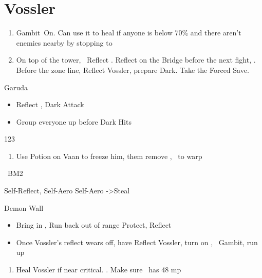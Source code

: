\chapter{Vossler}

\begin{enumerate}
\item Gambit\ashe\ On. Can use it to heal if anyone is below 70\% and there aren't enemies nearby by stopping to \flee
\item On top of the tower, \vaan\ Reflect \vaan. Reflect on the Bridge before the next fight, \leader{\penelo}. Before the zone line, Reflect Vossler, prepare Dark. Take the Forced Save.
\end{enumerate}
\begin{battle}{Garuda}
\begin{itemize}
\item Reflect \penelo, \ashe
\penelof Dark \ashe
\ashef Attack \penelo
\item Group everyone up before Dark Hits
\end{itemize}
\end{battle}
\begin{shop}{123}
\end{shop}
\begin{enumerate}
\item Use Potion on Vaan to freeze him, them remove \ashe, \penelo\ to warp
\end{enumerate}
\begin{liscense}
\ashe\ BM2
\end{liscense}
\begin{gambit}
\begin{itemize}
\penelof Self-Reflect, Self-Aero
\ashef Self-Aero
->Steal
\end{itemize}
\end{gambit}
\begin{battle}{Demon Wall}
\begin{itemize}
\item Bring in \ashe, \penelo
\vaanf Run back out of range
\vaanf Protect, Reflect \vaan
\item Once Vossler's reflect wears off, have \vaan Reflect Vossler, turn on \ashe, \penelo\ Gambit, run up
\end{itemize}
\end{battle}
\begin{enumerate}
\item Heal Vossler if near critical. . Make sure \penelo\ has 48 mp
\end{enumerate}
